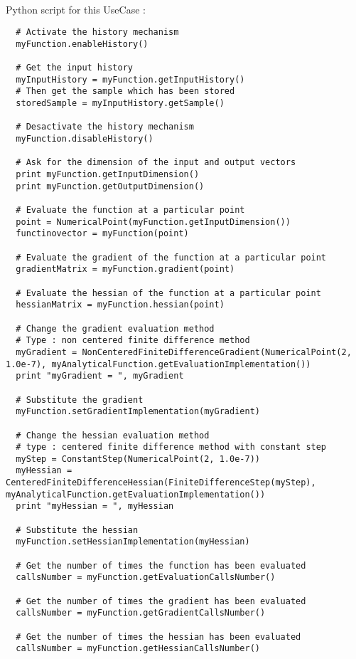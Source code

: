 \textspace\\
Python script for this UseCase :

\begin{lstlisting}
  # Activate the history mechanism
  myFunction.enableHistory()

  # Get the input history
  myInputHistory = myFunction.getInputHistory()
  # Then get the sample which has been stored
  storedSample = myInputHistory.getSample()

  # Desactivate the history mechanism
  myFunction.disableHistory()

  # Ask for the dimension of the input and output vectors
  print myFunction.getInputDimension()
  print myFunction.getOutputDimension()

  # Evaluate the function at a particular point
  point = NumericalPoint(myFunction.getInputDimension())
  functinovector = myFunction(point)

  # Evaluate the gradient of the function at a particular point
  gradientMatrix = myFunction.gradient(point)

  # Evaluate the hessian of the function at a particular point
  hessianMatrix = myFunction.hessian(point)

  # Change the gradient evaluation method
  # Type : non centered finite difference method
  myGradient = NonCenteredFiniteDifferenceGradient(NumericalPoint(2, 1.0e-7), myAnalyticalFunction.getEvaluationImplementation())
  print "myGradient = ", myGradient

  # Substitute the gradient
  myFunction.setGradientImplementation(myGradient)

  # Change the hessian evaluation method
  # type : centered finite difference method with constant step
  myStep = ConstantStep(NumericalPoint(2, 1.0e-7))
  myHessian = CenteredFiniteDifferenceHessian(FiniteDifferenceStep(myStep), myAnalyticalFunction.getEvaluationImplementation())
  print "myHessian = ", myHessian

  # Substitute the hessian
  myFunction.setHessianImplementation(myHessian)

  # Get the number of times the function has been evaluated
  callsNumber = myFunction.getEvaluationCallsNumber()

  # Get the number of times the gradient has been evaluated
  callsNumber = myFunction.getGradientCallsNumber()

  # Get the number of times the hessian has been evaluated
  callsNumber = myFunction.getHessianCallsNumber()


\end{lstlisting}
